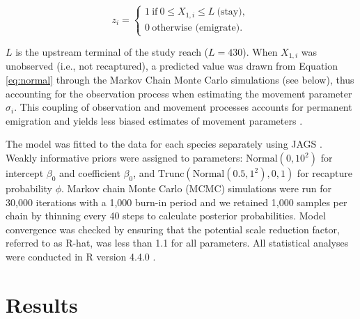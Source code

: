 \documentclass[11pt, class=article, crop=false]{standalone}
\begin{document}
\begin{equation}
    z_i =
    \begin{cases}
        1~\text{if}~0 \le X_{1,i} \le L~\text{(stay)},\\
        0~\text{otherwise (emigrate)}.
    \end{cases}
\end{equation}

$L$ is the upstream terminal of the study reach ($L = 430$). When $X_{1,i}$ was unobserved (i.e., not recaptured), a predicted value was drawn from Equation \ref{eq:normal} through the Markov Chain Monte Carlo simulations (see below), thus accounting for the observation process when estimating the movement parameter $\sigma_i$.
This coupling of observation and movement processes accounts for permanent emigration and yields less biased estimates of movement parameters \citep{teruiModelingDispersalUsing2020}.

The model was fitted to the data for each species separately using JAGS \citep{JAGSJustAnother}. Weakly informative priors were assigned to parameters: $\text{Normal}(0, 10^2)$ for intercept $\beta_0$ and coefficient $\beta_0$, and $\text{Trunc}(\text{Normal}(0.5, 1^2), 0, 1)$ for recapture probability $\phi$. Markov chain Monte Carlo (MCMC) simulations were run for 30,000 iterations with a 1,000 burn-in period and we retained 1,000 samples per chain by thinning every 40 steps to calculate posterior probabilities. Model convergence was checked by ensuring that the potential scale reduction factor, referred to as R-hat, was less than 1.1 for all parameters. All statistical analyses were conducted in R version 4.4.0 \citep{CoreTeam2020}.

\section{Results}
\end{document}
